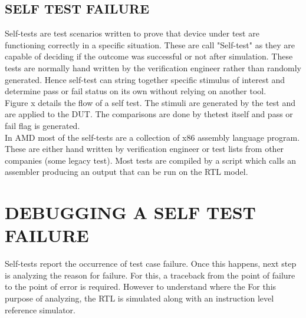%
%
%

\subsection {SELF TEST FAILURE}

Self-tests are test scenarios written to prove that device under test are functioning correctly in a specific situation. These are call "Self-test" as they are capable of deciding if the outcome was successful or not after simulation. These tests are normally hand written by the verification engineer rather than randomly generated.  Hence self-test can string together specific stimulus of interest and determine pass or fail status on its own without relying on another tool. \\
Figure x details the flow of a self test. The stimuli are generated by the test and are applied to the DUT. The comparisons are done by thetest itself and pass or fail flag is generated. \\
In AMD most of the self-tests are a collection of x86 assembly language program. These are either hand written by verification engineer or test lists from other companies (some legacy test). Most tests are compiled by a script which calls an assembler producing an output that can be run on the RTL model.


\section{DEBUGGING A SELF TEST FAILURE}

Self-tests report the occurrence of test case failure. Once this happens, next step is analyzing the reason for failure.  For this, a traceback from the point of failure to the point of error is required. However to understand where the  
For this purpose of analyzing, the RTL is simulated along with an instruction level reference simulator. 


